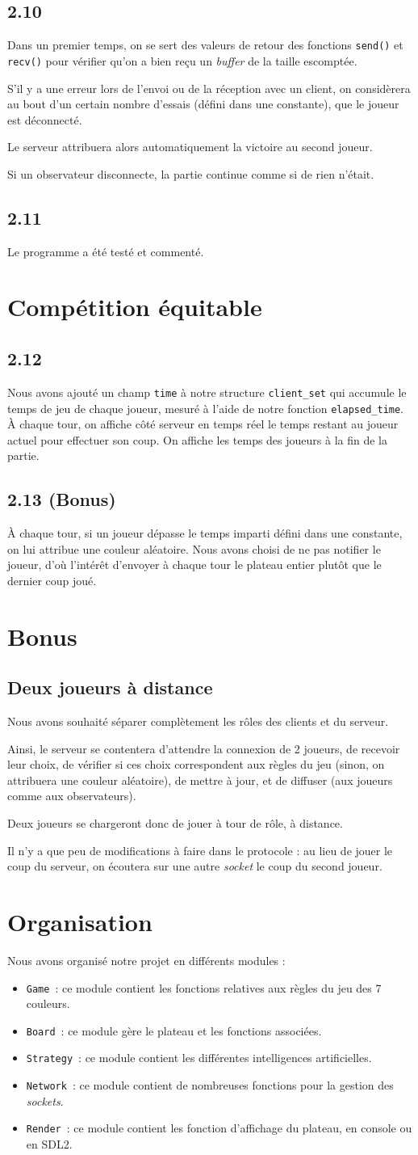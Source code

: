 \documentclass[12pt]{article}
\def\question#1{\subsection{#1}}
\def\sec#1{\section{#1}}
\begin{document}
\question{2.10}
Dans un premier temps, on se sert des valeurs de retour des fonctions \texttt{send()} et \texttt{recv()} pour vérifier qu'on a bien reçu un \textit{buffer} de la taille escomptée.

S'il y a une erreur lors de l'envoi ou de la réception avec un client, on considèrera au bout d'un certain nombre d'essais (défini dans une constante), que le joueur est déconnecté.

Le serveur attribuera alors automatiquement la victoire au second joueur. 

Si un observateur disconnecte, la partie continue comme si de rien n'était.
\question{2.11}
Le programme a été testé et commenté.


\sec{Compétition équitable}

\question{2.12}
Nous avons ajouté un champ \texttt{time} à notre structure \texttt{client\_set} qui accumule le temps de jeu de chaque joueur, mesuré à l'aide de notre fonction \texttt{elapsed\_time}. \\
À chaque tour, on affiche côté serveur en temps réel le temps restant au joueur actuel pour effectuer son coup.
On affiche les temps des joueurs à la fin de la partie.

\question{2.13 (Bonus)}
À chaque tour, si un joueur dépasse le temps imparti défini dans une constante, on lui attribue une couleur aléatoire. Nous avons choisi de ne pas notifier le joueur, d'où l'intérêt d'envoyer à chaque tour le plateau entier plutôt que le dernier coup joué.

\sec{Bonus}
\question{Deux joueurs à distance}

Nous avons souhaité séparer complètement les rôles des clients et du serveur.

Ainsi, le serveur se contentera d'attendre la connexion de 2 joueurs, de recevoir leur choix, de vérifier si ces choix correspondent aux règles du jeu (sinon, on attribuera une couleur aléatoire), de mettre à jour, et de diffuser (aux joueurs comme aux observateurs).

Deux joueurs se chargeront donc de jouer à tour de rôle, à distance.

Il n'y a que peu de modifications à faire dans le protocole : au lieu de jouer le coup du serveur, on écoutera sur une autre \textit{socket} le coup du second joueur.


\sec{Organisation}

Nous avons organisé notre projet en différents modules : 
\begin{itemize}
\item \texttt{Game}\ : ce module contient les fonctions relatives aux règles du jeu des 7 couleurs.
\item \texttt{Board}\ : ce module gère le plateau et les fonctions associées. 
\item \texttt{Strategy}\ : ce module contient les différentes intelligences artificielles. 
\item \texttt{Network}\ : ce module contient de nombreuses fonctions pour la gestion des \textit{sockets}.
\item \texttt{Render}\ : ce module contient les fonction d'affichage du plateau, en console ou en SDL2.
\end{itemize}
\end{document}
